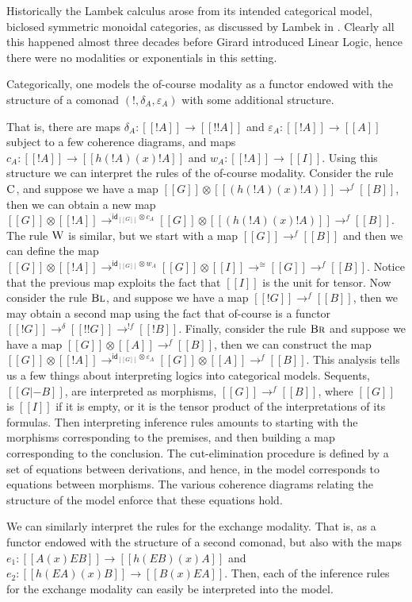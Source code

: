 \documentclass{article}
\let\mto\to                     %
\let\to\relax                   %
\newcommand{\to}{\rightarrow}
\newcommand{\id}{\mathsf{id}}
\begin{document}
Historically the Lambek calculus arose from its intended categorical
model, biclosed symmetric monoidal categories, as discussed by Lambek
in \cite{lambek1988}. Clearly all this happened almost three decades
before Girard introduced Linear Logic, hence there were no modalities
or exponentials in this setting.


Categorically, one models the of-course modality as a functor endowed
with the structure of a comonad $(!, \delta_A, \varepsilon_A)$ with
some additional structure.

That is, there are maps
$\delta_A : [[!A]] \mto [[!!A]]$ and $\varepsilon_A : [[!A]] \mto [[A]]$
subject to a few coherence diagrams, and maps $c_A : [[!A]] \mto
[[h(!A) (x) !A]]$ and $w_A : [[!A]] \mto [[I]]$.  Using this structure we can
interpret the rules of the of-course modality.  Consider the rule
$\textsc{C}$, and suppose we have a map
$[[G]] \otimes [[(h(!A) (x) !A)]] \mto^{f} [[B]]$, then we can obtain
a new map
$[[G]] \otimes [[!A]] \mto^{\id_{[[G]]} \otimes c_A} [[G]] \otimes [[(h(!A) (x) !A)]] \mto^f [[B]]$.
The rule $\textsc{W}$ is similar, but we start with a map $[[G]]
\mto^f [[B]]$ and then we can define the map
$[[G]] \otimes [[!A]] \mto^{\id_{[[G]]} \otimes w_A} [[G]] \otimes [[I]] \mto^\cong [[G]] \mto^{f} [[B]]$.
Notice that the previous map exploits the fact that $[[I]]$ is the
unit for tensor.  Now consider the rule $\textsc{Bl}$, and suppose
we have a map $[[!{G}]] \mto^f [[B]]$, then we may obtain a second map
using the fact that of-course is a functor $[[!{G}]] \mto^{\delta}
[[!{!{G}}]] \mto^{!f} [[!B]]$.  Finally, consider the rule
$\textsc{Br}$ and suppose we have a map $[[G]] \otimes [[A]]
\mto^f [[B]]$, then we can construct the map
$[[G]] \otimes [[!A]] \mto^{\id_{[[G]]} \otimes \varepsilon_A} [[G]]
\otimes [[A]] \mto^f [[B]]$.  This analysis tells us a few things
about interpreting logics into categorical models.  Sequents, $[[G |-
    B]]$, are interpreted as morphisms, $[[G]] \mto^f [[B]]$, where
$[[G]]$ is $[[I]]$ if it is empty, or it is the tensor product of the
interpretations of its formulas.  Then interpreting inference rules
amounts to starting with the morphisms corresponding to the premises,
and then building a map corresponding to the conclusion.  The
cut-elimination procedure is defined by a set of equations between
derivations, and hence, in the model corresponds to equations between
morphisms.  The various coherence diagrams relating the structure of
the model enforce that these equations hold.

We can similarly interpret the rules for the exchange modality.
That is, as a functor endowed with the structure of a second comonad,
but also with the maps $e_1 : [[A (x) E B]] \mto [[h(E B) (x) A]]$ and
$e_2 : [[h(E A) (x) B]] \mto [[B (x) E A]]$.  Then, each of the
inference rules for the exchange modality can easily be interpreted
into the model.
\end{document}
